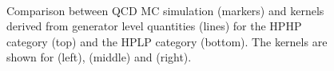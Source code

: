 \begin{figure}[h!]
\\
\caption{Comparison between QCD MC simulation (markers) and kernels derived from generator level quantities (lines) for the HPHP category (top) and the HPLP category (bottom). The kernels are shown for \MJO (left), \MJT (middle) and \MVV (right).}
\label{fig:3DkernelsHPHPpythia}
\end{figure}

